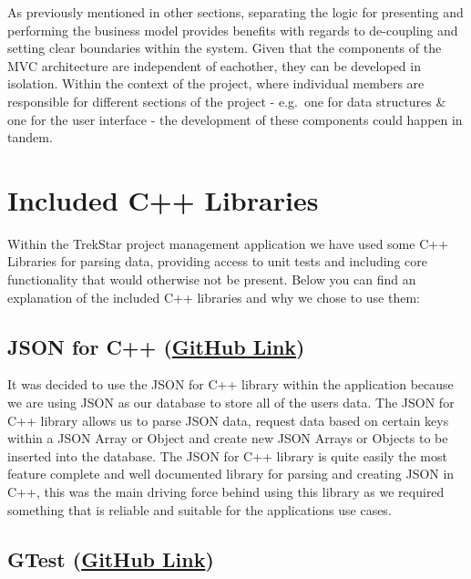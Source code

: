 \documentclass[
  english,
  a4paper,
,tablecaptionabove
]{scrartcl}
\begin{document}
As previously mentioned in other sections, separating the logic for
presenting and performing the business model provides benefits with
regards to de-coupling and setting clear boundaries within the system.
Given that the components of the MVC architecture are independent of
eachother, they can be developed in isolation. Within the context of the
project, where individual members are responsible for different sections
of the project - e.g.~one for data structures \& one for the user
interface - the development of these components could happen in tandem.

\newpage

\hypertarget{included-c-libraries}{%
\section{Included C++ Libraries}\label{included-c-libraries}}

Within the TrekStar project management application we have used some C++
Libraries for parsing data, providing access to unit tests and including
core functionality that would otherwise not be present. Below you can
find an explanation of the included C++ libraries and why we chose to
use them:

\hypertarget{json-for-c-github-link}{%
\subsection{\texorpdfstring{JSON for C++
(\href{https://github.com/nlohmann/json}{GitHub
Link})}{JSON for C++ (GitHub Link)}}\label{json-for-c-github-link}}

It was decided to use the JSON for C++ library within the application
because we are using JSON as our database to store all of the users
data. The JSON for C++ library allows us to parse JSON data, request
data based on certain keys within a JSON Array or Object and create new
JSON Arrays or Objects to be inserted into the database. The JSON for
C++ library is quite easily the most feature complete and well
documented library for parsing and creating JSON in C++, this was the
main driving force behind using this library as we required something
that is reliable and suitable for the applications use cases.

\hypertarget{gtest-github-link}{%
\subsection{\texorpdfstring{GTest
(\href{https://github.com/google/googletest}{GitHub
Link})}{GTest (GitHub Link)}}\label{gtest-github-link}}
\end{document}
